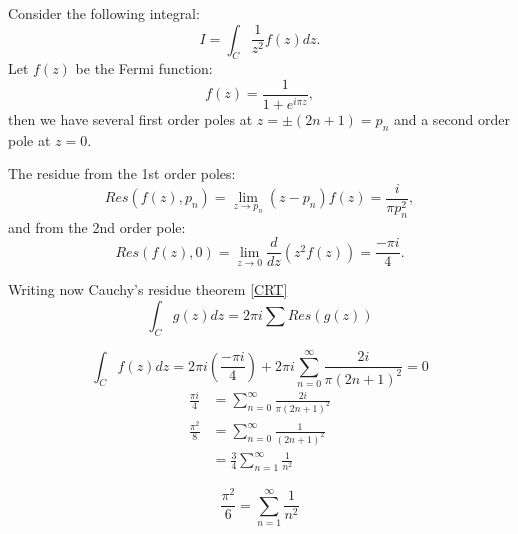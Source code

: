\begin{problem}


Consider the following integral:
\begin{equation}
	I = \int_C \frac{1}{z^2} f(z) dz.
\end{equation} Let $f(z) $ be the Fermi function:
\begin{equation}
	f(z) = \frac{1}{1+ e^{i\pi z}},
\end{equation} then we have several first order poles at $z=\pm (2n + 1 ) =p_n$ and a second order pole at $z=0$.

The residue from the 1st order poles:
\begin{equation}
	Res(f(z),p_n) = \lim_{z\rightarrow p_n} (z-p_n) f(z) = \frac{i}{\pi p_n^2},
\end{equation} and from the 2nd order pole:
\begin{equation}
	Res(f(z),0) = \lim_{z\rightarrow 0} \frac{d}{dz} (z^2 f(z)) = \frac{-\pi i}{4}.
\end{equation}

Writing now Cauchy's residue theorem \ref{CRT}
\begin{equation}
	\int_C g(z) dz = 2\pi i \sum Res(g(z))
\end{equation}

\begin{equation}
	\int_C f(z) dz = 2 \pi i \left(  \frac{-\pi i}{4} \right) + 2 \pi i \sum_{n=0}^\infty \frac{2i}{\pi (2n+1)^2} = 0
\end{equation}
\begin{align}
	\frac{\pi i }{4} &= \sum_{n=0}^\infty \frac{2i}{\pi (2n+1)^2} \\
	\frac{\pi^2}{8} &= \sum_{n=0}^\infty \frac{1}{(2n+1)^2}\\
	&= \frac{3}{4}\sum_{n=1}^\infty \frac{1}{n^2}
\end{align}

\begin{equation}
	\frac{\pi^2}{6} = \sum_{n=1}^\infty \frac{1}{n^2}
\end{equation}
\end{problem}
